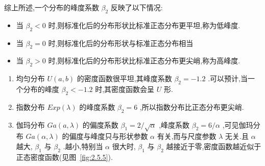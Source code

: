 综上所述,一个分布的峰度系数 $ \beta_{2} $ 反映了以下情况:

\begin{itemize}
	\item 当 $ \beta_{2}<0 $ 时,则标准化后的分布形状比标准正态分布更平坦,称为低峰度.
	\item 当 $ \beta_{2}=0 $ 时,则标准化后的分布形状与标准正态分布相当
	\item 当 $ \beta_{2}>0 $ 时,则标准化后的分布形状比标准正态分布更尖峭,称为高峰度.
\end{itemize}

\begin{example}\label{exam:2.75}
	\begin{enumerate}
		\item 均匀分布 $ U(a,b) $ 的密度函数很平坦,其峰度系数 $ \beta_{2}= -1.2 $ .可以预计,当一个分布的峰度 $ \beta_{2}<-1.2 $ 时,其密度函数会呈 $ U $ 形.
		\item 指数分布 $ E x p(\lambda) $ 的峰度系数 $ \beta_{2}=6 $ ,所以指数分布比正态分布更尖峭.
		\item 伽玛分布 $ G a(a, \lambda) $ 的偏度系数 $ \beta_{1}=2 / \sqrt{\alpha} $ ,峰度系数 $ \beta_{2}=6 / \alpha $ ,可见伽玛分布 $ G a(\alpha, \lambda) $ 的偏度与峰度只与形状参数 $ \alpha $ 有关,而与尺度参数 $ \lambda $ 无关.且 $ \alpha $ 越大, $ \beta_{1} $ 与 $ \beta_{2} $ .越小,特别当 $ \alpha $ 很大时, $ \beta_{1} $ 与 $ \beta_{2} $ 越接近于零,密度函数越近似于正态密度函数(见图~\ref{fig:2.5.5}).
	\end{enumerate}
\end{example}

